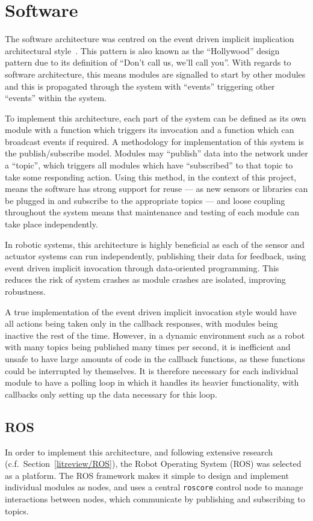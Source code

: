 
\chapter{Software}\label{software}
The software architecture was centred on the event driven implicit implication
architectural style~\cite{garlan1993introduction}. This pattern is
also known as the ``Hollywood'' design pattern due to its definition of ``Don't
call us, we'll call you''. With regards to software architecture, this means
modules are signalled to start by other modules and this is propagated through
the system with ``events'' triggering other ``events'' within the system.

To implement this architecture, each part of the system can be defined as its own
module with a function which triggers its invocation and a function which can
broadcast events if required. A methodology for implementation of this system is
the publish/subscribe model. Modules may ``publish'' data into the network under a
``topic'', which triggers all modules which have ``subscribed'' to that topic to
take some responding action. Using this method, in the context of this project,
means the software has strong support for reuse --- as new sensors or libraries can
be plugged in and subscribe to the appropriate topics --- and loose coupling
throughout the system means that maintenance and testing of each module can take place independently.

In robotic systems, this architecture is highly beneficial as each of the sensor
and actuator systems can run independently, publishing their data for feedback,
using event driven implicit invocation through data-oriented programming. This
reduces the risk of system crashes as module crashes are isolated, improving
robustness.

A true implementation of the event driven implicit invocation style would have all
actions being taken only in the callback responses, with modules being inactive
the rest of the time. However, in a dynamic environment such as a robot with many
topics being published many times per second, it is inefficient and unsafe to have
large amounts of code in the callback functions, as these functions could be
interrupted by themselves. It is therefore necessary for each individual
module to have a polling loop in which it handles its heavier functionality, with
callbacks only setting up the data necessary for this loop.

\section{ROS}\label{soft/ROS}
In order to implement this architecture, and following extensive research
(c.f.\ Section~\ref{litreview/ROS}), the Robot Operating System (ROS) was
selected as a platform. The ROS framework makes it simple to design and implement
individual modules as nodes, and uses a central \verb|roscore| control
node to manage interactions between nodes, which communicate by publishing and
subscribing to topics.

